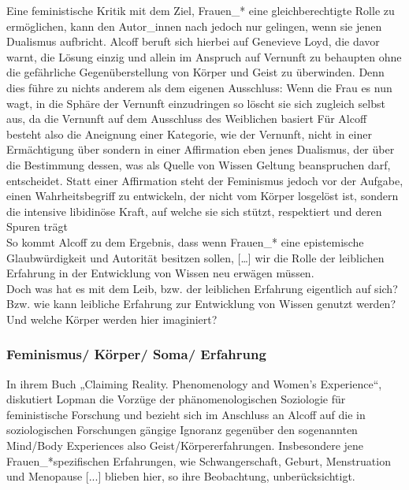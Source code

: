 \noindent Eine feministische Kritik mit
dem Ziel, Frauen\_* eine gleichberechtigte Rolle zu ermöglichen, kann den
Autor\_innen nach jedoch nur gelingen, wenn sie jenen Dualismus aufbricht.
Alcoff beruft sich hierbei auf Genevieve Loyd, die davor warnt, die Lösung
einzig und allein im Anspruch auf Vernunft zu behaupten ohne die gefährliche
Gegenüberstellung von Körper und Geist zu überwinden. Denn dies führe zu nichts
anderem als dem eigenen Ausschluss: \glqq Wenn die Frau es nun wagt, in die Sphäre
der Vernunft einzudringen so löscht sie sich zugleich selbst aus, da die
Vernunft auf dem Ausschluss des Weiblichen basiert \grqq \footnotemark
{} Für Alcoff besteht also
die Aneignung einer Kategorie, wie der Vernunft, nicht in einer Ermächtigung
über sondern in einer Affirmation eben jenes Dualismus, der über die Bestimmung
dessen, was als Quelle von Wissen Geltung beanspruchen darf, entscheidet. Statt
einer Affirmation steht der Feminismus jedoch vor der Aufgabe, einen
Wahrheitsbegriff zu entwickeln, der nicht vom Körper losgelöst ist, sondern
\glqq
die intensive libidinöse Kraft, auf welche sie sich stützt, respektiert und
deren Spuren trägt \grqq \footnotemark {}\\
So kommt Alcoff zu dem Ergebnis, dass \glqq wenn Frauen\_* eine
epistemische Glaubwürdigkeit und Autorität besitzen sollen, […] wir die Rolle
der leiblichen Erfahrung in der Entwicklung von Wissen neu erwägen \grqq
\footnotemark {} müssen.\\
\noindent Doch was hat es mit dem Leib, bzw. der leiblichen Erfahrung eigentlich auf
sich? Bzw. wie kann leibliche Erfahrung zur Entwicklung von Wissen genutzt
werden? Und welche Körper werden hier imaginiert?

\subsubsection{Feminismus/ Körper/ Soma/ Erfahrung}

In ihrem Buch „Claiming Reality. Phenomenology and Women's Experience“,
diskutiert Lopman die Vorzüge der phänomenologischen Soziologie für
feministische Forschung und bezieht sich im Anschluss an Alcoff auf die in
soziologischen Forschungen gängige Ignoranz gegenüber den sogenannten
\glqq Mind/Body Experiences \grqq also Geist/Körpererfahrungen. Insbesondere jene
Frauen\_*spezifischen Erfahrungen, wie \glqq Schwangerschaft, Geburt, Menstruation
und Menopause [...]\grqq \footnotemark {} blieben hier, so ihre Beobachtung, unberücksichtigt.\\

